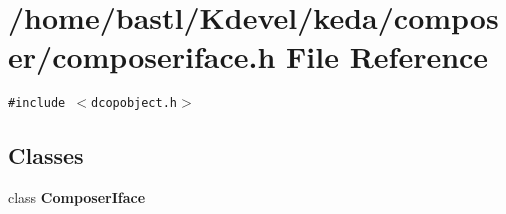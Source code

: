 \section{/home/bastl/Kdevel/keda/composer/composeriface.h File Reference}
\label{composeriface_8h}
{\tt \#include $<$dcopobject.h$>$}\par
\subsection*{Classes}
\begin{CompactItemize}
\item 
class {\bf Composer\-Iface}
\end{CompactItemize}
